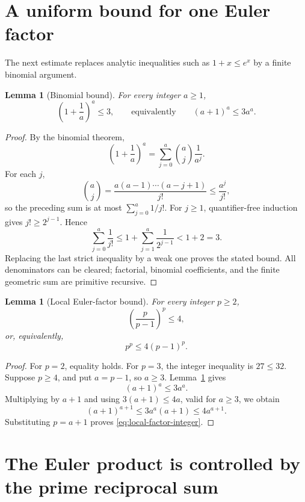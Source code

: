 \documentclass[11pt]{article}
\newtheorem{lemma}[theorem]{Lemma}
\theoremstyle{definition}
\begin{document}
\section{A uniform bound for one Euler factor}

The next estimate replaces analytic inequalities such as
\(1+x\leq e^x\) by a finite binomial argument.

\begin{lemma}[Binomial bound]\label{lem:binomial-three}
For every integer \(a\geq 1\),
\[
  \left(1+\frac1a\right)^a\leq 3,
  \qquad\text{equivalently}\qquad
  (a+1)^a\leq 3a^a.
\]
\end{lemma}

\begin{proof}
By the binomial theorem,
\[
 \left(1+\frac1a\right)^a
 =\sum_{j=0}^{a}\binom aj\frac1{a^j}.
\]
For each \(j\),
\[
  \binom aj
  =\frac{a(a-1)\cdots(a-j+1)}{j!}
  \leq\frac{a^j}{j!},
\]
so the preceding sum is at most \(\sum_{j=0}^{a}1/j!\).  For \(j\geq1\),
quantifier-free induction gives \(j!\geq2^{j-1}\).  Hence
\[
 \sum_{j=0}^{a}\frac1{j!}
 \leq 1+\sum_{j=1}^{a}\frac1{2^{j-1}}
 < 1+2=3.
\]
Replacing the last strict inequality by a weak one proves the stated bound.
All denominators can be cleared; factorial, binomial coefficients, and the
finite geometric sum are primitive recursive.
\end{proof}

\begin{lemma}[Local Euler-factor bound]\label{lem:local-factor}
For every integer \(p\geq2\),
\begin{equation}\label{eq:local-factor-rational}
  \left(\frac{p}{p-1}\right)^p\leq4,
\end{equation}
or, equivalently,
\begin{equation}\label{eq:local-factor-integer}
  p^p\leq4(p-1)^p.
\end{equation}
\end{lemma}

\begin{proof}
For \(p=2\), equality holds.  For \(p=3\), the integer inequality is
\(27\leq32\).  Suppose \(p\geq4\), and put \(a=p-1\), so \(a\geq3\).
Lemma~\ref{lem:binomial-three} gives
\[
  (a+1)^a\leq3a^a.
\]
Multiplying by \(a+1\) and using \(3(a+1)\leq4a\), valid for \(a\geq3\),
we obtain
\[
  (a+1)^{a+1}\leq3a^a(a+1)\leq4a^{a+1}.
\]
Substituting \(p=a+1\) proves \eqref{eq:local-factor-integer}.
\end{proof}

\section{The Euler product is controlled by the prime reciprocal sum}
\end{document}
